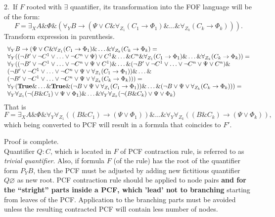 \documentclass[a4paper,12pt]{article}
\begin{document}
2.~If $F$ rooted with $\exists$ quantifier, its transformation into the FOF language will be of the form:
$$F = \exists_X A\&\Phi\&(\forall_Y B\rightarrow (\Psi\vee C\&\forall_{Z_1}(C_1\rightarrow\Phi_1)\&\ldots\&\forall_{Z_k}(C_k\rightarrow\Phi_k))).$$
Transform expression in parenthesis.
$$
\begin{array}{l}
\forall_Y B\rightarrow (\Psi\vee C\&\forall_{Z_1}(C_1\rightarrow\Phi_1)\&\ldots\&\forall_{Z_k}(C_k\rightarrow\Phi_k) =\\
\forall_Y ((\neg B'\vee\neg C^1\vee\ldots\vee\neg C^n\vee\Psi) \vee C^1\&\ldots\& C^n\&\forall_{Z_1}(C_1\rightarrow\Phi_1)\&\ldots\&\forall_{Z_k}(C_k\rightarrow\Phi_k)) =\\
\forall_Y ((\neg B'\vee\neg C^1\vee\ldots\vee\neg C^n\vee\Psi\vee C^1)\&\ldots\&(\neg B'\vee\neg C^1\vee\ldots\vee\neg C^n\vee\Psi\vee C^n)\&\\
(\neg B'\vee\neg C^1\vee\ldots\vee\neg C^n\vee\Psi\vee\forall_{Z_1}(C_1\rightarrow\Phi_1) )\&\ldots\&\\
(\neg B'\vee\neg C^1\vee\ldots\vee\neg C^n\vee\Psi\vee\forall_{Z_k}(C_k\rightarrow\Phi_k) )) = \\
\forall_Y (\text{\textbf{True}}\&\ldots\&\text{\textbf{True}}\&(\neg B\vee\Psi\vee\forall_{Z_1}(C_1\rightarrow\Phi_1) )\&\ldots\&(\neg B\vee\Psi\vee\forall_{Z_k}(C_k\rightarrow\Phi_k) )) = \\
\forall_Y\forall_{Z_1}(\neg(B\& C_1)\vee\Psi\vee\Phi_1)\&\ldots\&\forall_Y\forall_{Z_k}(\neg(B\& C_k)\vee\Psi\vee\Phi_k)
\end{array}
$$
That is $$F = \exists_X A\&\Phi\&\forall_Y\forall_{Z_1}((B\& C_1)\rightarrow(\Psi\vee\Phi_1))\&\ldots\&\forall_Y\forall_{Z_k}((B\& C_k)\rightarrow(\Psi\vee\Phi_k)),$$
which being converted to PCF will result in a formula that coincides to $F'$.

Proof is complete.\\[-0.5em]

Quantifier $Q\colon C$, which is located in $F$ of PCF contraction rule, is referred to as \emph{trivial quantifier}.  Also, if formula $F$ (of the rule) has the root of the quantifier form $P_Y B$, then the PCF must be adjusted by adding new fictitious quantifier $Q\varnothing$ as new root.  PCF contraction rule should be applied to node pairs \textbf{and for the ``stright'' parts inside a PCF, which 'lead' not to branching} starting from leaves of the PCF.  Application to the branching parts must be avoided unless the resulting contracted PCF will contain less number of nodes.
\end{document}
